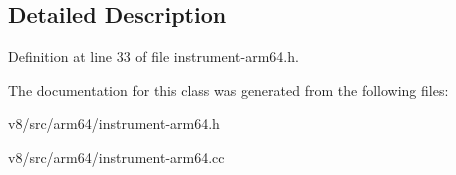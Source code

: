\subsection{Detailed Description}


Definition at line 33 of file instrument-\/arm64.\+h.



The documentation for this class was generated from the following files\+:\begin{DoxyCompactItemize}
\item 
v8/src/arm64/instrument-\/arm64.\+h\item 
v8/src/arm64/instrument-\/arm64.\+cc\end{DoxyCompactItemize}
